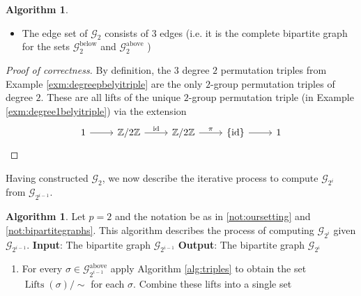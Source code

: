 \documentclass{dcthesis}
\newcommand{\ZZ}{\mathbb Z}
\DeclareMathOperator{\Lifts}{Lifts}
\DeclareMathOperator{\id}{id}
\numberwithin{equation}{section}
\theoremstyle{definition}
\newtheorem{alg}[equation]{Algorithm}
\theoremstyle{remark}
\begin{document}
{{{\begin{alg}
\begin{itemize}
        \item
          \label{alg:alltriplesbasecaseedges}
          The edge set of $\mathscr{G}_2$
          consists of $3$ edges
          (i.e. it is the complete
          bipartite graph for the sets
          $\mathscr{G}_2^\text{below}$
          and
          $\mathscr{G}_2^\text{above}$
          )
      \end{itemize}
    \end{alg}
    \begin{proof}[Proof of correctness]
      By definition,
      the $3$ degree $2$ permutation triples
      from Example \ref{exm:degreepbelyitriple}
      are the only $2$-group permutation triples
      of degree $2$.
      These are all lifts of the unique
      $2$-group permutation triple
      (in Example \ref{exm:degree1belyitriple})
      via the extension
      \begin{equation}
        \label{eqn:trivialliftdegree2}
        \begin{tikzcd}
          1\arrow{r}&\ZZ/2\ZZ\arrow{r}{\id}
                    &\ZZ/2\ZZ\arrow{r}{\pi}
                    &\{\id\}\arrow{r}&1
        \end{tikzcd}
      \end{equation}
    \end{proof}
    Having constructed $\mathscr{G}_2$,
    we now describe the iterative process to
    compute $\mathscr{G}_{2^i}$
    from $\mathscr{G}_{2^{i-1}}$.
    \begin{alg}
      \label{alg:alltriplesiteration}
      Let $p=2$ and the notation be as in
      \ref{not:oursetting} and
      \ref{not:bipartitegraphs}.
      This algorithm describes the process
      of computing $\mathscr{G}_{2^i}$
      given $\mathscr{G}_{2^{i-1}}$.
      \newline
      \textbf{Input}:
      The bipartite graph
      $\mathscr{G}_{2^{i-1}}$
      \newline
      \textbf{Output}:
      The bipartite graph
      $\mathscr{G}_{2^{i}}$
      \begin{enumerate}
        \item
          \label{alg:alltriplesiterationcomputelifts}
          For every
          $\sigma\in\mathscr{G}_{2^{i-1}}^\text{above}$
          apply Algorithm \ref{alg:triples}
          to obtain the set
          $\Lifts(\sigma)/\!\!\sim$ for each
          $\sigma$.
          Combine these lifts into a single set
          \begin{equation}
            \label{eqn:unionofliftsabove}

\end{equation}
\end{enumerate}
\end{alg}}}}
\end{document}
